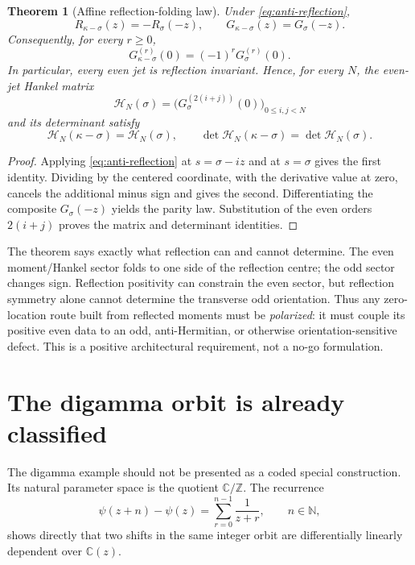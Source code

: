 \documentclass[11pt]{article}
\newtheorem{theorem}{Theorem}[section]
\theoremstyle{definition}
\theoremstyle{remark}
\newcommand{\C}{\mathbb C}
\newcommand{\N}{\mathbb N}
\newcommand{\Z}{\mathbb Z}
\begin{document}
\begin{theorem}[Affine reflection-folding law]\label{thm:reflection-folding}
Under \eqref{eq:anti-reflection},
\[
  R_{\kappa-\sigma}(z)=-R_\sigma(-z),
  \qquad
  G_{\kappa-\sigma}(z)=G_\sigma(-z).
\]
Consequently, for every \(r\geq0\),
\[
  G_{\kappa-\sigma}^{(r)}(0)=(-1)^rG_\sigma^{(r)}(0).
\]
In particular, every even jet is reflection invariant.  Hence, for every \(N\), the
even-jet Hankel matrix
\[
  \mathcal H_N(\sigma)
  =\bigl(G_\sigma^{(2(i+j))}(0)\bigr)_{0\leq i,j<N}
\]
and its determinant satisfy
\[
  \mathcal H_N(\kappa-\sigma)=\mathcal H_N(\sigma),
  \qquad
  \det\mathcal H_N(\kappa-\sigma)=\det\mathcal H_N(\sigma).
\]
\end{theorem}

\begin{proof}
Applying \eqref{eq:anti-reflection} at \(s=\sigma-iz\) and at \(s=\sigma\)
gives the first identity.  Dividing by the centered coordinate, with the derivative value at
zero, cancels the additional minus sign and gives the second.  Differentiating the composite
\(G_\sigma(-z)\) yields the parity law.  Substitution of the even orders \(2(i+j)\) proves the
matrix and determinant identities.
\end{proof}

The theorem says exactly what reflection can and cannot determine.  The even moment/Hankel
sector folds to one side of the reflection centre; the odd sector changes sign.  Reflection
positivity can constrain the even sector, but reflection symmetry alone cannot determine the
transverse odd orientation.  Thus any zero-location route built from reflected moments must be
\emph{polarized}: it must couple its positive even data to an odd, anti-Hermitian, or otherwise
orientation-sensitive defect.  This is a positive architectural requirement, not a no-go
formulation.

\section{The digamma orbit is already classified}

The digamma example should not be presented as a coded special construction.  Its natural
parameter space is the quotient \(\C/\Z\).  The recurrence
\begin{equation}\label{eq:digamma-shift}
  \psi(z+n)-\psi(z)=\sum_{r=0}^{n-1}\frac1{z+r},
  \qquad n\in\N,
\end{equation}
shows directly that two shifts in the same integer orbit are differentially linearly dependent
over \(\C(z)\).
\end{document}
